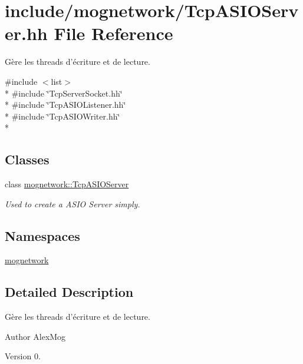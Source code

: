 \hypertarget{_tcp_a_s_i_o_server_8hh}{\section{include/mognetwork/\-Tcp\-A\-S\-I\-O\-Server.hh File Reference}
\label{_tcp_a_s_i_o_server_8hh}
}


Gère les threads d'écriture et de lecture.  


{\ttfamily \#include $<$list$>$}\\*
{\ttfamily \#include \char`\"{}Tcp\-Server\-Socket.\-hh\char`\"{}}\\*
{\ttfamily \#include \char`\"{}Tcp\-A\-S\-I\-O\-Listener.\-hh\char`\"{}}\\*
{\ttfamily \#include \char`\"{}Tcp\-A\-S\-I\-O\-Writer.\-hh\char`\"{}}\\*
\subsection*{Classes}
\begin{DoxyCompactItemize}
\item 
class \hyperlink{classmognetwork_1_1_tcp_a_s_i_o_server}{mognetwork\-::\-Tcp\-A\-S\-I\-O\-Server}
\begin{DoxyCompactList}\small\item\em Used to create a A\-S\-I\-O Server simply. \end{DoxyCompactList}\end{DoxyCompactItemize}
\subsection*{Namespaces}
\begin{DoxyCompactItemize}
\item 
\hyperlink{namespacemognetwork}{mognetwork}
\end{DoxyCompactItemize}


\subsection{Detailed Description}
Gère les threads d'écriture et de lecture. \begin{DoxyAuthor}{Author}
Alex\-Mog 
\end{DoxyAuthor}
\begin{DoxyVersion}{Version}
0. 
\end{DoxyVersion}
